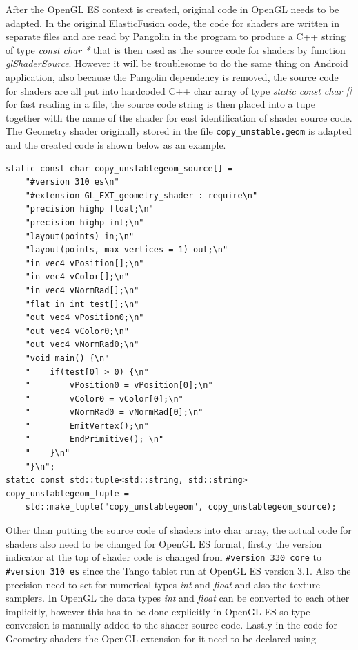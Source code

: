 \documentclass[12pt,twoside]{article}
\begin{document}
After the OpenGL ES context is created, original code in OpenGL needs to be adapted. In the original ElasticFusion code, the code for shaders are written in separate files and are read by Pangolin in the program to produce a C++ string of type \textit{const char *} that is then used as the source code for shaders by function \textit{glShaderSource}. However it will be troublesome to do the same thing on Android application, also because the Pangolin dependency is removed, the source code for shaders are all put into hardcoded C++ char array of type \textit{static const char []} for fast reading in a file, the source code string is then placed into a tupe together with the name of the shader for east identification of shader source code. The Geometry shader originally stored in the file \verb|copy_unstable.geom| is adapted and the created code is shown below as an example.\\
\begin{lstlisting}
static const char copy_unstablegeom_source[] =
    "#version 310 es\n"
    "#extension GL_EXT_geometry_shader : require\n"
    "precision highp float;\n"
    "precision highp int;\n"
    "layout(points) in;\n"
    "layout(points, max_vertices = 1) out;\n"
    "in vec4 vPosition[];\n"
    "in vec4 vColor[];\n"
    "in vec4 vNormRad[];\n"
    "flat in int test[];\n"
    "out vec4 vPosition0;\n"
    "out vec4 vColor0;\n"
    "out vec4 vNormRad0;\n"
    "void main() {\n"
    "    if(test[0] > 0) {\n"
    "        vPosition0 = vPosition[0];\n"
    "        vColor0 = vColor[0];\n"
    "        vNormRad0 = vNormRad[0];\n"
    "        EmitVertex();\n"
    "        EndPrimitive(); \n"
    "    }\n"
    "}\n";
static const std::tuple<std::string, std::string> copy_unstablegeom_tuple =
    std::make_tuple("copy_unstablegeom", copy_unstablegeom_source);
\end{lstlisting}
Other than putting the source code of shaders into char array, the actual code for shaders also need to be changed for OpenGL ES format, firstly the version indicator at the top of shader code is changed from \verb|#version 330 core| to \verb|#version 310 es| since the Tango tablet run at OpenGL ES version 3.1. Also the precision need to set for numerical types \textit{int} and \textit{float} and also the texture samplers. In OpenGL the data types  \textit{int} and \textit{float} can be converted to each other implicitly, however this has to be done explicitly in OpenGL ES so type conversion is manually added to the shader source code. Lastly in the code for Geometry shaders the OpenGL extension for it need to be declared using \\
\end{document}

